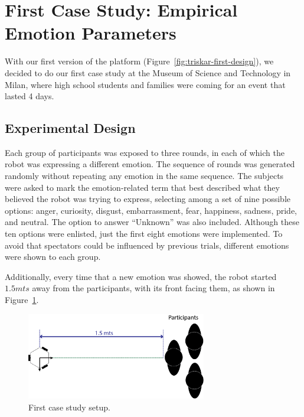 \section{First Case Study: Empirical Emotion Parameters}

With our first version of the platform (Figure~\ref{fig:triskar-first-design}), we decided to do our first case study at the Museum of Science and Technology in Milan, where high school students and families were coming for an event that lasted 4 days. 


\subsection{Experimental Design}

Each group of participants was exposed to three rounds, in each of which the robot was expressing a different emotion. The sequence of rounds was generated randomly without repeating any emotion in the same sequence. The subjects were asked to mark the emotion-related term that best described what they believed the robot was trying to express, selecting among a set of nine possible options: anger, curiosity, disgust, embarrassment, fear, happiness, sadness, pride, and neutral. The option to answer ``Unknown'' was also included. Although these ten options were enlisted, just the first eight emotions were implemented. To avoid that spectators could be influenced by previous trials, different emotions were shown to each group.

Additionally, every time that a new emotion was showed, the robot started $1.5 mts$ away from the participants, with its front facing them, as shown in  Figure~\ref{fig:setup}. 

\begin{figure}[h]
	\centering
	\includegraphics[width=0.7\textwidth]{./Images/FirstCase.png} 
	\caption{First case study setup.}
	\label{fig:setup}
\end{figure}  

